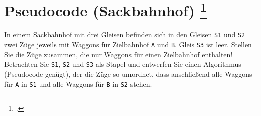 \documentclass{bschlangaul-aufgabe}
\begin{document}

\section{Pseudocode (Sackbahnhof)
\footcite[Seite 3, Aufgabe 4: Stack]{aud:ab:7}}

In einem Sackbahnhof mit drei Gleisen befinden sich in den Gleisen
\texttt{S1} und \texttt{S2} zwei Züge jeweils mit Waggons für
Zielbahnhof \texttt{A} und \texttt{B}. Gleis \texttt{S3} ist leer.
Stellen Sie die Züge zusammen, die nur Waggons für einen Zielbahnhof
enthalten! Betrachten Sie \texttt{S1}, \texttt{S2} und \texttt{S3} als
Stapel und entwerfen Sie einen Algorithmus (Pseudocode genügt), der die
Züge so umordnet, dass anschließend alle Waggons für \texttt{A} in
\texttt{S1} und alle Waggons für \texttt{B} in \texttt{S2} stehen.
\end{document}
